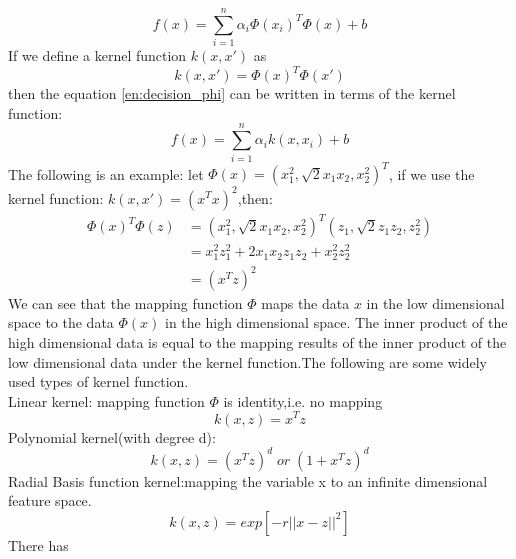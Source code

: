 \begin{equation}\label{en:decision_phi}
f(x) =\sum_{i=1}^{n} \alpha_i\Phi(x_i)^T\Phi(x)+b
\end{equation} 
If we define a kernel function $k(x,x')$ as
\begin{equation}\label{kernel}
k(x,x')=\Phi(x)^T\Phi(x')
\end{equation}
then the equation \ref{en:decision_phi} can be written in terms of the kernel function:
\begin{equation}\label{decision_kernal}
f(x)=\sum_{i=1}^{n}\alpha_ik(x,x_i)+b
\end{equation}
The following is an example: let $\Phi(x)=(x_1^2,\sqrt{2}x_1x_2,x_2^2)^T$, if we use the kernel function: $k(x,x')=(x^Tx)^2$,then:
\begin{equation*}
\begin{aligned}
\Phi(x)^T\Phi(z)&=(x_1^2,\sqrt{2}x_1x_2,x_2^2)^T(z_1,\sqrt{2}z_1z_2,z_2^2)\\
&=x_1^2z_1^2+2x_1x_2z_1z_2+x_2^2z_2^2\\
&=(x^Tz)^2
\end{aligned}
\end{equation*}
We can see that the mapping function $\Phi$ maps the data $x$ in the low dimensional space to the data $\Phi(x)$ in the high dimensional space. The inner product of the high dimensional data is equal to the mapping results of the inner product of the low dimensional data under the kernel function.The following are some widely used types of kernel function.\\
Linear kernel: mapping function $\Phi$ is identity,i.e. no mapping
\begin{equation}
k(x,z)=x^Tz
\end{equation}
Polynomial kernel(with degree d):
\begin{equation}
k(x,z)=(x^Tz)^d\;or\;(1+x^Tz)^d
\end{equation}
Radial Basis function kernel:mapping the variable x to an infinite dimensional feature space.
\begin{equation}
k(x,z)=exp[-r||x-z||^2]
\end{equation}
There has 

